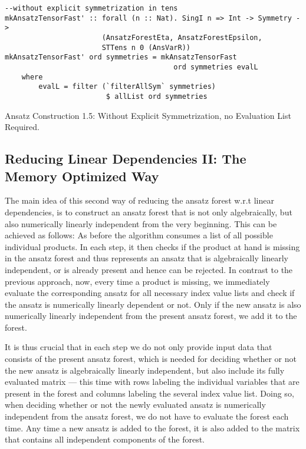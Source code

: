 \begin{listing}[hbt!]
\begin{verbatim}
--without explicit symmetrization in tens
mkAnsatzTensorFast' :: forall (n :: Nat). SingI n => Int -> Symmetry ->
                       (AnsatzForestEta, AnsatzForestEpsilon,
                       STTens n 0 (AnsVarR))
mkAnsatzTensorFast' ord symmetries = mkAnsatzTensorFast
                                        ord symmetries evalL
    where
        evalL = filter (`filterAllSym` symmetries) 
                        $ allList ord symmetries
\end{verbatim} 
\caption{Ansatz Construction 1.5: Without Explicit Symmetrization,  no Evaluation List Required.}\label{mkAnsatzFast'2}
\end{listing}

\subsection*{Reducing Linear Dependencies II:  The Memory Optimized Way}

The main idea of this second way of reducing the ansatz forest w.r.t linear dependencies, is to construct an ansatz forest that is not only algebraically, but also numerically linearly independent from the very beginning. This can be achieved as follows: As before the algorithm consumes a list of all possible individual products. In each step, it then checks if the product at hand is missing in the ansatz forest and thus represents an ansatz that is algebraically linearly independent, or is already present and hence can be rejected. In contrast to the previous approach, now, every time a product is missing, we immediately evaluate the corresponding ansatz for all necessary index value lists and check if the ansatz is numerically linearly dependent or not. Only if the new ansatz is also numerically linearly  independent from the present ansatz forest, we add it to the forest.

It is thus crucial that in each step we do not only provide input data that consists of the present ansatz forest, which is needed for deciding whether or not the new ansatz is algebraically linearly independent, but also include its fully evaluated matrix --- this time with rows labeling the individual variables that are present in the forest and columns labeling the several index value list.
Doing so, when deciding whether or not the newly evaluated ansatz is numerically  independent from the ansatz forest, we do not have to evaluate the forest each time. Any time a  new ansatz is added to the forest, it is also added to the matrix that contains all independent components of the forest.

